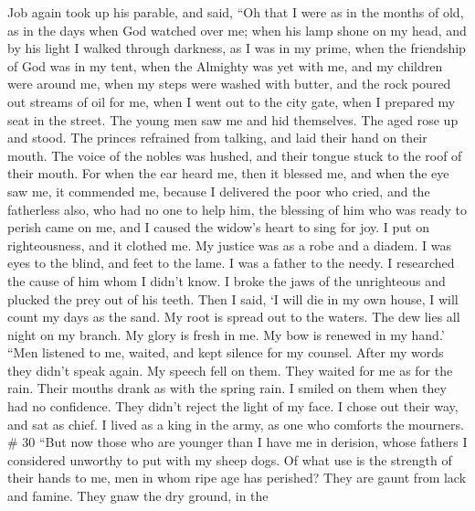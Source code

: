  Job again took up his parable, and said, 
``Oh that I were as in the months of old, as in the days when God
watched over me;  when his lamp shone on my head, and by
his light I walked through darkness,  as I was in my
prime, when the friendship of God was in my tent,  when
the Almighty was yet with me, and my children were around me,
 when my steps were washed with butter, and the rock
poured out streams of oil for me,  when I went out to the
city gate, when I prepared my seat in the street.  The
young men saw me and hid themselves. The aged rose up and stood.
 The princes refrained from talking, and laid their hand
on their mouth.  The voice of the nobles was hushed, and
their tongue stuck to the roof of their mouth.  For when
the ear heard me, then it blessed me, and when the eye saw me, it
commended me,  because I delivered the poor who cried,
and the fatherless also, who had no one to help him,  the
blessing of him who was ready to perish came on me, and I caused the
widow's heart to sing for joy.  I put on righteousness,
and it clothed me. My justice was as a robe and a diadem.
 I was eyes to the blind, and feet to the lame.
 I was a father to the needy. I researched the cause of
him whom I didn't know.  I broke the jaws of the
unrighteous and plucked the prey out of his teeth.  Then
I said, `I will die in my own house, I will count my days as the sand.
 My root is spread out to the waters. The dew lies all
night on my branch.  My glory is fresh in me. My bow is
renewed in my hand.'  ``Men listened to me, waited, and
kept silence for my counsel.  After my words they didn't
speak again. My speech fell on them.  They waited for me
as for the rain. Their mouths drank as with the spring rain.
 I smiled on them when they had no confidence. They
didn't reject the light of my face.  I chose out their
way, and sat as chief. I lived as a king in the army, as one who
comforts the mourners. \# 30  ``But now those who are
younger than I have me in derision, whose fathers I considered unworthy
to put with my sheep dogs.  Of what use is the strength of
their hands to me, men in whom ripe age has perished? 
They are gaunt from lack and famine. They gnaw the dry ground, in the
